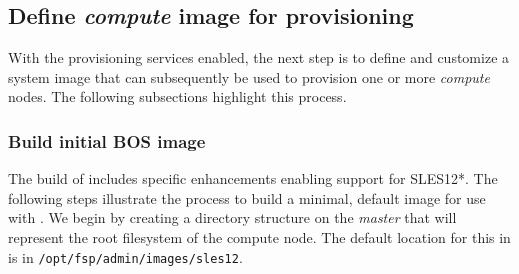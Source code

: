 \documentclass[letterpaper]{article}
\newcommand{\baseOS}{SLES12*}
\begin{document}




\subsection{Define {\em compute} image for provisioning}

With the provisioning services enabled, the next step is to define and
customize a system image that can subsequently be used to provision one or more
{\em compute} nodes. The following subsections highlight this process.

\subsubsection{Build initial BOS image}

The \FSP{} build of \Warewulf{} includes specific enhancements enabling support for
\baseOS{}. The following steps illustrate the process to build a minimal, default
image for use with \Warewulf{}.  We begin by creating a directory structure on the 
{\em master} that will represent the root filesystem of the compute node. The 
default location for this in \FSP{} is in \texttt{/opt/fsp/admin/images/sles12}.
\end{document}
